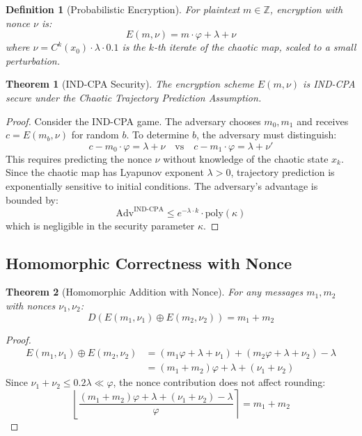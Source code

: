 \documentclass{article}
\newtheorem{theorem}{Theorem}[section]
\newtheorem{definition}{Definition}[section]
\begin{document}
\begin{definition}[Probabilistic Encryption]
For plaintext $m \in \mathbb{Z}$, encryption with nonce $\nu$ is:
\begin{equation}
E(m, \nu) = m \cdot \varphi + \lambda + \nu
\end{equation}
where $\nu = C^k(x_0) \cdot \lambda \cdot 0.1$ is the $k$-th iterate of the chaotic map, scaled to a small perturbation.
\end{definition}

\begin{theorem}[IND-CPA Security]
\label{thm:indcpa}
The encryption scheme $E(m, \nu)$ is IND-CPA secure under the Chaotic Trajectory Prediction Assumption.
\end{theorem}

\begin{proof}
Consider the IND-CPA game. The adversary chooses $m_0, m_1$ and receives $c = E(m_b, \nu)$ for random $b$. To determine $b$, the adversary must distinguish:
\begin{equation}
c - m_0 \cdot \varphi = \lambda + \nu \quad \text{vs} \quad c - m_1 \cdot \varphi = \lambda + \nu'
\end{equation}
This requires predicting the nonce $\nu$ without knowledge of the chaotic state $x_k$. Since the chaotic map has Lyapunov exponent $\lambda > 0$, trajectory prediction is exponentially sensitive to initial conditions. The adversary's advantage is bounded by:
\begin{equation}
\text{Adv}^{\text{IND-CPA}} \leq e^{-\lambda \cdot k} \cdot \text{poly}(\kappa)
\end{equation}
which is negligible in the security parameter $\kappa$.
\end{proof}

\subsection{Homomorphic Correctness with Nonce}

\begin{theorem}[Homomorphic Addition with Nonce]
For any messages $m_1, m_2$ with nonces $\nu_1, \nu_2$:
\begin{equation}
D(E(m_1, \nu_1) \oplus E(m_2, \nu_2)) = m_1 + m_2
\end{equation}
\end{theorem}

\begin{proof}
\begin{align}
E(m_1, \nu_1) \oplus E(m_2, \nu_2) &= (m_1\varphi + \lambda + \nu_1) + (m_2\varphi + \lambda + \nu_2) - \lambda \\
&= (m_1 + m_2)\varphi + \lambda + (\nu_1 + \nu_2)
\end{align}
Since $\nu_1 + \nu_2 \leq 0.2\lambda \ll \varphi$, the nonce contribution does not affect rounding:
\begin{equation}
\left\lfloor \frac{(m_1+m_2)\varphi + \lambda + (\nu_1+\nu_2) - \lambda}{\varphi} \right\rceil = m_1 + m_2
\end{equation}
\end{proof}
\end{document}

